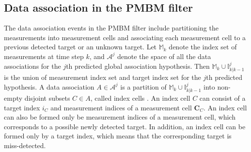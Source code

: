 

\subsection{Data association in the PMBM filter}
The data association events in the PMBM filter include partitioning the measurements into measurement cells and associating each measurement cell to a previous detected target or an unknown target. Let $\mathbb{M}_k$ denote the index set of measurements at time step $k$, and $\mathcal{A}^j$ denote the space of all the data associations for the $j$th predicted global association hypothesis. Then $\mathbb{M}_k\cup\mathbb{I}^j_{k|k-1}$ is the union of measurement index set and target index set for the $j$th predicted hypothesis. A data association $A\in\mathcal{A}^j$ is a partition of $\mathbb{M}_k\cup\mathbb{I}^j_{k|k-1}$ into non-empty disjoint subsets $C\in A$, called index cells \cite{pmbmextended2}. An index cell $C$ can consist of a target index $i_C$ and measurement indices of a measurement cell $\mathbf{C}_C$. An index cell can also be formed only be measurement indices of a measurement cell, which corresponds to a possible newly detected target. In addition, an index cell can be formed only by a target index, which means that the corresponding target is miss-detected. 

